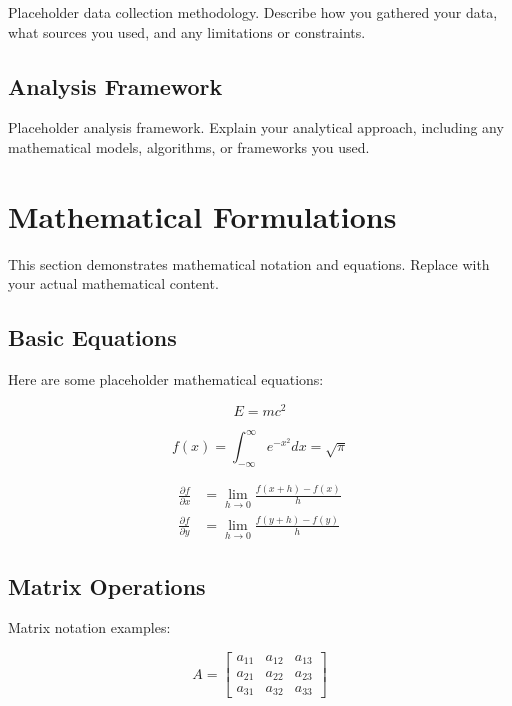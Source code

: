 Placeholder data collection methodology. Describe how you gathered your data, what sources you used, and any limitations or constraints.

\subsection{Analysis Framework}\label{subsec:analysis-framework}

Placeholder analysis framework. Explain your analytical approach, including any mathematical models, algorithms, or frameworks you used.

\section{Mathematical Formulations}\label{sec:mathematical-formulations}

This section demonstrates mathematical notation and equations. Replace with your actual mathematical content.

\subsection{Basic Equations}\label{subsec:basic-equations}

Here are some placeholder mathematical equations:

\begin{equation}
E = mc^2
\end{equation}

\begin{equation}
f(x) = \int_{-\infty}^{\infty} e^{-x^2} dx = \sqrt{\pi}
\end{equation}

\begin{align}
\frac{\partial f}{\partial x} &= \lim_{h \to 0} \frac{f(x+h) - f(x)}{h} \\
\frac{\partial f}{\partial y} &= \lim_{h \to 0} \frac{f(y+h) - f(y)}{h}
\end{align}

\subsection{Matrix Operations}\label{subsec:matrix-operations}

Matrix notation examples:

\begin{equation}
A = \begin{bmatrix}
a_{11} & a_{12} & a_{13} \\
a_{21} & a_{22} & a_{23} \\
a_{31} & a_{32} & a_{33}
\end{bmatrix}
\end{equation}

